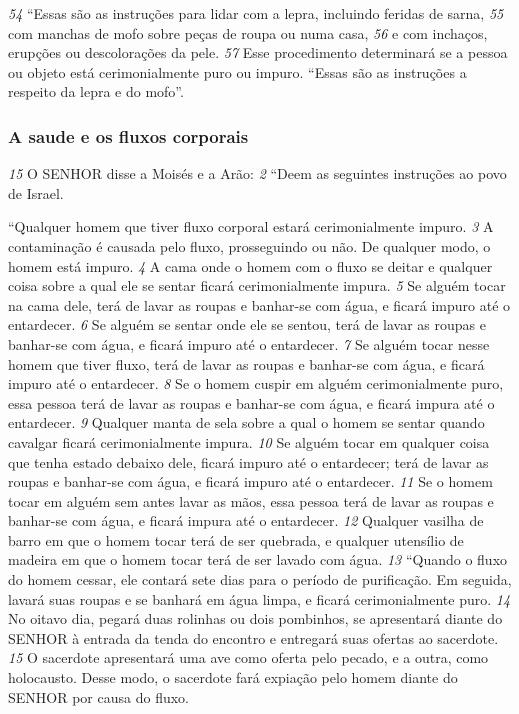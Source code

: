 \smallskip
\textit{\tiny 54}
“Essas são as instruções para lidar com a lepra, incluindo feridas de sarna,
\textit{\tiny 55}
com manchas de mofo sobre peças de roupa ou numa casa, 
\textit{\tiny 56}
e com inchaços,
erupções ou descolorações da pele. 
\textit{\tiny 57}
Esse procedimento determinará se a pessoa
ou objeto está cerimonialmente puro ou impuro.
   “Essas são as instruções a respeito da lepra e do mofo”.


\bigskip
\subsubsection*{A saude e os fluxos corporais}
   
\textit{\tiny 15}
 O SENHOR disse a Moisés e a Arão: 
\textit{\tiny 2} 
“Deem as seguintes instruções ao povo
de Israel.

\smallskip
   “Qualquer homem que tiver fluxo corporal estará cerimonialmente impuro. 
\textit{\tiny 3} 
A contaminação é causada pelo fluxo, prosseguindo ou não. De qualquer modo, o
homem está impuro. 
\textit{\tiny 4} 
A cama onde o homem com o fluxo se deitar e qualquer
coisa sobre a qual ele se sentar ficará cerimonialmente impura. 
\textit{\tiny 5} 
Se alguém tocar
na cama dele, terá de lavar as roupas e banhar-se com água, e ficará impuro até o
entardecer. 
\textit{\tiny 6} 
Se alguém se sentar onde ele se sentou, terá de lavar as roupas e
banhar-se com água, e ficará impuro até o entardecer. 
\textit{\tiny 7} 
Se alguém tocar nesse
homem que tiver fluxo, terá de lavar as roupas e banhar-se com água, e ficará
impuro até o entardecer. 
\textit{\tiny 8} 
Se o homem cuspir em alguém cerimonialmente puro,
essa pessoa terá de lavar as roupas e banhar-se com água, e ficará impura até o
entardecer. 
\textit{\tiny 9} 
Qualquer manta de sela sobre a qual o homem se sentar quando
cavalgar ficará cerimonialmente impura. 
\textit{\tiny 10}
Se alguém tocar em qualquer coisa
que tenha estado debaixo dele, ficará impuro até o entardecer; terá de lavar as
roupas e banhar-se com água, e ficará impuro até o entardecer. 
\textit{\tiny 11}
Se o homem
tocar em alguém sem antes lavar as mãos, essa pessoa terá de lavar as roupas e
banhar-se com água, e ficará impura até o entardecer. 
\textit{\tiny 12}
Qualquer vasilha de
barro em que o homem tocar terá de ser quebrada, e qualquer utensílio de
madeira em que o homem tocar terá de ser lavado com água.
\textit{\tiny 13}
“Quando o fluxo do homem cessar, ele contará sete dias para o período de
purificação. Em seguida, lavará suas roupas e se banhará em água limpa, e ficará
cerimonialmente puro. 
\textit{\tiny 14}
No oitavo dia, pegará duas rolinhas ou dois pombinhos,
se apresentará diante do SENHOR à entrada da tenda do encontro e entregará suas
ofertas ao sacerdote. 
\textit{\tiny 15}
O sacerdote apresentará uma ave como oferta pelo
pecado, e a outra, como holocausto. Desse modo, o sacerdote fará expiação pelo
homem diante do SENHOR por causa do fluxo.
   
